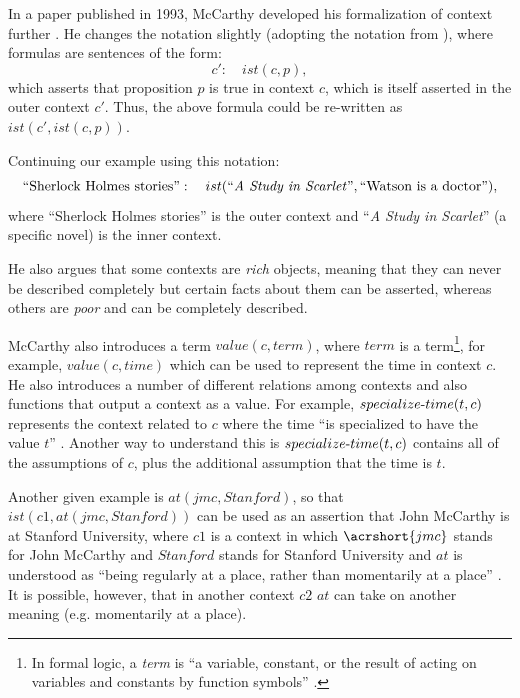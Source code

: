 In a paper published in 1993, McCarthy developed his formalization of context further \cite{McCarthy1993}. He changes the notation slightly (adopting the notation from \cite{guha1991contexts}), where formulas are sentences of the form:
\begin{equation}
  \label{eq:ist1}
 c': \quad	ist(c,p),
\end{equation}
which asserts that proposition $p$ is true in context $c$, which is itself asserted in the outer context $c'$. Thus, the above formula could be re-written as $ist(c', ist(c,p))$. 

Continuing our example using this notation:
\begin{equation}
  \label{eq:context1}
 \text{``Sherlock Holmes stories''}: \quad	ist(\text{``\emph{A Study in Scarlet}''},\text{``Watson is a doctor''}),
\end{equation}
where ``Sherlock Holmes stories'' is the outer context and ``\emph{A Study in Scarlet}'' (a specific novel) is the inner context.

He also argues that some contexts are \emph{rich} objects, meaning that they can never be described completely but certain facts about them can be asserted, whereas others are \emph{poor} and can be completely described.

McCarthy also introduces a term $value(c,term)$, where $term$ is a term\footnote{In formal logic, a \emph{term} is ``a variable, constant, or the result of acting on variables and constants by function symbols'' \cite{Weisstein2014}.}, for example, $value(c,time)$ which can be used to represent the time in context $c$. He also introduces a number of different relations among contexts and also functions that output a context as a value. For example, $specialize\textnormal{-}time(t, c)$ represents the context related to $c$ where the time ``is specialized to have the value $t$'' \cite{McCarthy1993}. Another way to understand this is $specialize\textnormal{-}time(t, c)$ contains all of the assumptions of $c$, plus the additional assumption that the time is $t$.

Another given example is $at(jmc, Stanford)$, so that $ist(c1, at(jmc, Stanford))$ can be used as an assertion that John McCarthy  is at Stanford University, where $c1$ is a context in which $\acrshort{jmc}$ stands for John McCarthy and $Stanford$ stands for Stanford University and $at$ is understood as ``being regularly at a place, rather than momentarily at a place'' \cite{McCarthy1993}. It is possible, however, that in another context $c2$ $at$ can take on another meaning (e.g. momentarily at a place).

